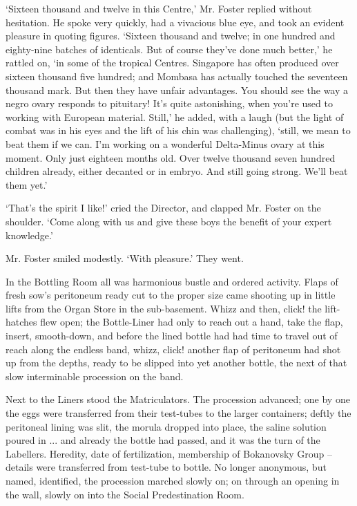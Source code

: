 \documentclass[10pt,a4paper]{article}
\newcommand{\sqm}[1]{‘#1’}
\begin{document}
\sqm{Sixteen thousand and twelve in this Centre,} Mr. Foster replied without hesitation. He spoke very quickly, had a vivacious blue eye, and took an evident pleasure in quoting figures. \sqm{Sixteen thousand and twelve; in one hundred and eighty-nine batches of identicals. But of course they've done much better,} he rattled on, \sqm{in some of the tropical Centres. Singapore has often produced over sixteen thousand five hundred; and Mombasa has actually touched the seventeen thousand mark. But then they have unfair advantages. You should see the way a negro ovary responds to pituitary! It's quite astonishing, when you're used to working with European material. Still,} he added, with a laugh (but the light of combat was in his eyes and the lift of his chin was challenging), \sqm{still, we mean to beat them if we can. I'm working on a wonderful Delta-Minus ovary at this moment. Only just eighteen months old. Over twelve thousand seven hundred children already, either decanted or in embryo. And still going strong. We'll beat them yet.}

\sqm{That's the spirit I like!} cried the Director, and clapped Mr. Foster on the shoulder. \sqm{Come along with us and give these boys the benefit of your expert knowledge.}

Mr. Foster smiled modestly. \sqm{With pleasure.} They went.

In the Bottling Room all was harmonious bustle and ordered activity. Flaps of fresh sow's peritoneum ready cut to the proper size came shooting up in little lifts from the Organ Store in the sub-basement. Whizz and then, click! the lift-hatches flew open; the Bottle-Liner had only to reach out a hand, take the flap, insert, smooth-down, and before the lined bottle had had time to travel out of reach along the endless band, whizz, click! another flap of peritoneum had shot up from the depths, ready to be slipped into yet another bottle, the next of that slow interminable procession on the band.

Next to the Liners stood the Matriculators. The procession advanced; one by one the eggs were transferred from their test-tubes to the larger containers; deftly the peritoneal lining was slit, the morula dropped into place, the saline solution poured in ... and already the bottle had passed, and it was the turn of the Labellers. Heredity, date of fertilization, membership of Bokanovsky Group – details were transferred from test-tube to bottle. No longer anonymous, but named, identified, the procession marched slowly on; on through an opening in the wall, slowly on into the Social Predestination Room.
\end{document}
